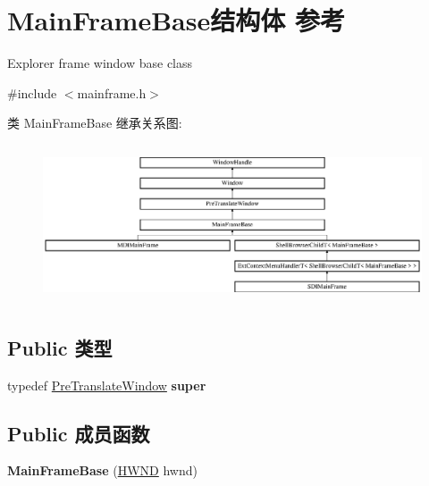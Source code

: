 \hypertarget{struct_main_frame_base}{}\section{Main\+Frame\+Base结构体 参考}
\label{struct_main_frame_base}


Explorer frame window base class  




{\ttfamily \#include $<$mainframe.\+h$>$}

类 Main\+Frame\+Base 继承关系图\+:\begin{figure}[H]
\begin{center}
\leavevmode
\includegraphics[height=4.734299cm]{struct_main_frame_base}
\end{center}
\end{figure}
\subsection*{Public 类型}
\begin{DoxyCompactItemize}
\item 
\mbox{\label{struct_main_frame_base_a13a4858abb472ab414148a6a2a51e161}} 
typedef \hyperlink{struct_pre_translate_window}{Pre\+Translate\+Window} {\bfseries super}
\end{DoxyCompactItemize}
\subsection*{Public 成员函数}
\begin{DoxyCompactItemize}
\item 
\mbox{\label{struct_main_frame_base_abc9077efa8b342a37e5134e4cd023035}} 
{\bfseries Main\+Frame\+Base} (\hyperlink{interfacevoid}{H\+W\+ND} hwnd)
\end{DoxyCompactItemize}

